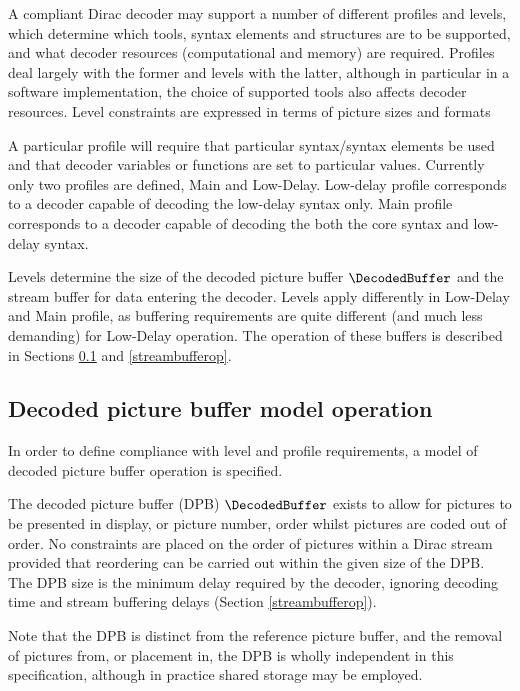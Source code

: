 \label{profilelevel}

A compliant Dirac decoder may support a number of different profiles and levels, which determine 
which tools, syntax elements and structures are to be supported, and what decoder resources 
(computational and memory) are required. Profiles deal largely with the former and levels
with the latter, although in particular in a software implementation, the choice of supported tools
also affects decoder resources. Level constraints are expressed in terms of picture sizes and 
formats 

A particular profile will require that particular syntax/syntax elements be used and that decoder
variables or functions are set to particular values. Currently only two profiles are defined, Main and Low-Delay. Low-delay profile corresponds to a decoder capable of decoding the low-delay syntax only. 
Main profile corresponds to a decoder capable of decoding the both the core syntax and low-delay syntax.

Levels determine the size of the
decoded picture buffer $\DecodedBuffer$ and the stream buffer for data entering the decoder. Levels
apply differently in Low-Delay and Main profile, as buffering requirements are quite different (and much
less demanding) for Low-Delay operation.
The operation of these buffers is described in Sections \ref{decodedbufferop} and \ref{streambufferop}.

\subsection{Decoded picture buffer model operation}
\label{decodedbufferop}

In order to define compliance with level and profile requirements, a model of decoded picture buffer
operation is specified.

The decoded picture buffer (DPB) $\DecodedBuffer$ exists to allow for pictures to be presented in display, or 
picture number, order whilst pictures are coded out of order. No constraints are placed on the order
of pictures within a Dirac stream provided that reordering can be carried out within the given size of
the DPB. The DPB size is the minimum delay required by the decoder, ignoring decoding time and stream
buffering delays (Section \ref{streambufferop}).

Note that the DPB is distinct from the reference picture buffer, and the removal of pictures from,
or placement in, the DPB is wholly independent in this specification, although in practice shared
storage may be employed.

